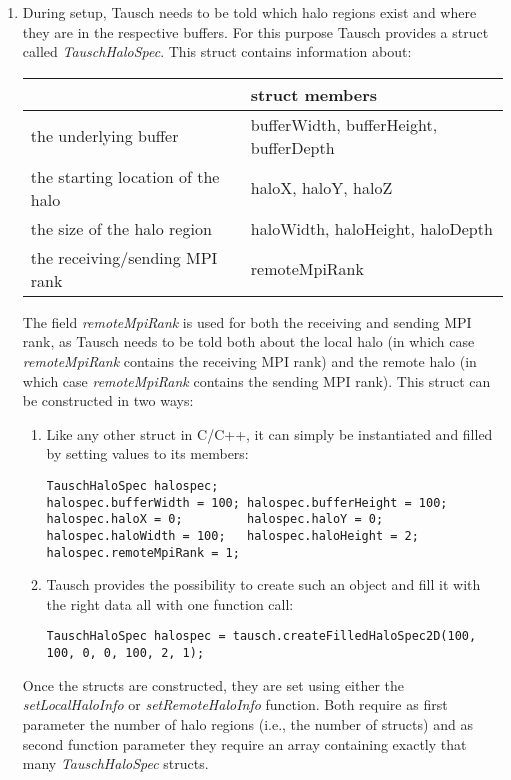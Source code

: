 \documentclass{article}
\begin{document}
\begin{enumerate}
    \item During setup, Tausch needs to be told which halo regions exist and where they are in the respective buffers. For this purpose Tausch provides a struct called \emph{TauschHaloSpec}. This struct contains information about:
    \begin{table}[ht]\centering
    \begin{tabular}{|l|l|}
        \hline
        \rowcolor{black!10}
        & \bfseries struct members\\
        \hline
        the underlying buffer & bufferWidth, bufferHeight, bufferDepth\\
        the starting location of the halo & haloX, haloY, haloZ\\
        the size of the halo region & haloWidth, haloHeight, haloDepth\\
        the receiving/sending MPI rank & remoteMpiRank\\
        \hline
    \end{tabular}
    \end{table}

    The field \emph{remoteMpiRank} is used for both the receiving and sending MPI rank, as Tausch needs to be told both about the local halo (in which case \emph{remoteMpiRank} contains the receiving MPI rank) and the remote halo (in which case \emph{remoteMpiRank} contains the sending MPI rank). This struct can be constructed in two ways:
    \begin{enumerate}
        \item Like any other struct in C/C++, it can simply be instantiated and filled by setting values to its members:
        \begin{lstlisting}
TauschHaloSpec halospec;
halospec.bufferWidth = 100; halospec.bufferHeight = 100;
halospec.haloX = 0;         halospec.haloY = 0;
halospec.haloWidth = 100;   halospec.haloHeight = 2;
halospec.remoteMpiRank = 1;
        \end{lstlisting}
        \item Tausch provides the possibility to create such an object and fill it with the right data all with one function call:
        \begin{lstlisting}
TauschHaloSpec halospec = tausch.createFilledHaloSpec2D(100, 100, 0, 0, 100, 2, 1);
        \end{lstlisting}
    \end{enumerate}

    Once the structs are constructed, they are set using either the \emph{setLocalHaloInfo} or \emph{setRemoteHaloInfo} function. Both require as first parameter the number of halo regions (i.e., the number of structs) and as second function parameter they require an array containing exactly that many \emph{TauschHaloSpec} structs.


\end{enumerate}
\end{document}
